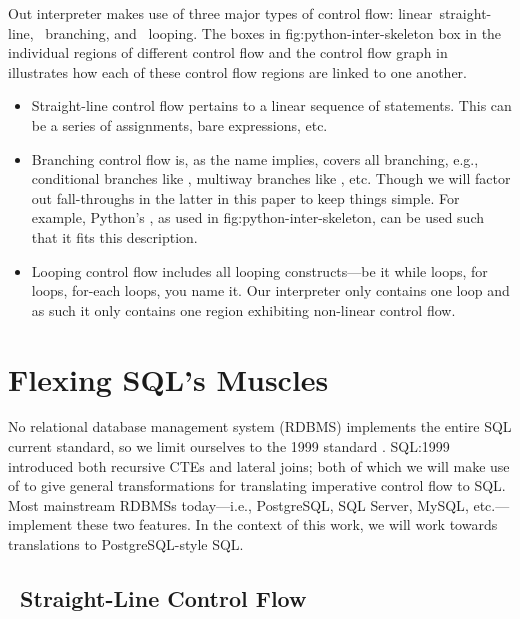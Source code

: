 \documentclass[sigconf,nonacm,screen,review,balance=false]{acmart}
\begin{document}
Out interpreter makes use of three major types of control flow:{\color
{linear}\ \mbox{straight-line}}, {\color{branching}\ \mbox{branching}}, and
{\color{nonlinear}\ \mbox{looping}}. The boxes in \Cref
{fig:python-inter-skeleton} box in the individual regions of different control
flow and the control flow graph in  illustrates how each of
these control flow regions are linked to one another.

\begin{itemize}
  \item[\linearCF{}] {\color{linear}Straight-line} control flow pertains to a
   linear sequence of statements. This can be a series of assignments, bare
   expressions, etc.

   \item[\branchingCF{}] {\color{branching}Branching} control flow is, as the
    name implies, covers all branching, e.g., conditional branches
    like , multiway branches like , etc. Though we
    will factor out fall-throughs in the latter in this paper to keep things
    simple. For example, Python's , as used in \Cref
    {fig:python-inter-skeleton}, can be used such that it fits this
    description.

  \item[\nonlinearCF{}] {\color{nonlinear}Looping} control flow includes all
   looping constructs---be it while loops, for loops, for-each loops, you name
   it. Our interpreter only contains one loop and as such it only contains one
   region exhibiting non-linear control flow.
\end{itemize}

\section{Flexing SQL's Muscles}
\label{sec:flexing}

No relational database management system (RDBMS) implements the entire SQL
current standard, so we limit ourselves to the 1999 standard \cite
{sql-1999}. SQL:1999 introduced both recursive CTEs and lateral joins; both of
which we will make use of to give general transformations for translating
imperative control flow to SQL. Most mainstream RDBMSs today---i.e.,
PostgreSQL\cite{postgres}, SQL Server\cite{sqlserver}, MySQL\cite
{mysql}, etc.---implement these two features. In the context of this work, we
will work towards translations to PostgreSQL-style SQL.

\subsection{\usebox{\linearCFbox}\ Straight-Line Control Flow}
\label{sec:linear-cf}
\end{document}
